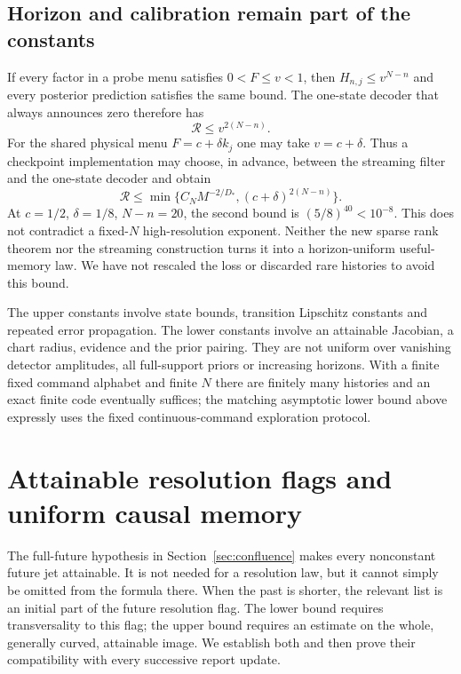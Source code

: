 \documentclass[11pt]{amsart}
\theoremstyle{definition}\newtheorem{definition}[theorem]{Definition}
\theoremstyle{remark}\newtheorem{remark}[theorem]{Remark}
\begin{document}
\subsection{Horizon and calibration remain part of the constants}
If every factor in a probe menu satisfies $0<F\le v<1$, then
$H_{n,j}\le v^{N-n}$ and every posterior prediction satisfies the same
bound. The one-state decoder that always announces zero therefore has
\begin{equation}\label{eq:zero-memory}
 \mathcal R\le v^{2(N-n)}.
\end{equation}
For the shared physical menu $F=c+\delta k_j$ one may take $v=c+\delta$.
Thus a checkpoint implementation may choose, in advance, between the
streaming filter and the one-state decoder and obtain
\[
 \mathcal R\le\min\{C_N M^{-2/D_*},(c+\delta)^{2(N-n)}\}.
\]
At $c=1/2$, $\delta=1/8$, $N-n=20$, the second bound is
$(5/8)^{40}<10^{-8}$. This does not contradict a fixed-$N$ high-resolution
exponent. Neither the new sparse rank theorem nor the streaming construction
turns it into a horizon-uniform useful-memory law. We have not rescaled
the loss or discarded rare histories to avoid this bound.

The upper constants involve state bounds, transition Lipschitz constants
and repeated error propagation. The lower constants involve an attainable
Jacobian, a chart radius, evidence and the prior pairing. They are not
uniform over vanishing detector amplitudes, all full-support priors or
increasing horizons. With a finite fixed command alphabet and finite $N$
there are finitely many histories and an exact finite code eventually
suffices; the matching asymptotic lower bound above expressly uses the
fixed continuous-command exploration protocol.

\section{Attainable resolution flags and uniform causal memory}\label{sec:attainable-flag}
The full-future hypothesis in Section~\ref{sec:confluence} makes every
nonconstant future jet attainable. It is not needed for a resolution law,
but it cannot simply be omitted from the formula there. When the past is
shorter, the relevant list is an initial part of the future resolution
flag. The lower bound requires transversality to this flag; the upper
bound requires an estimate on the whole, generally curved, attainable
image. We establish both and then prove their compatibility with every
successive report update.
\end{document}
